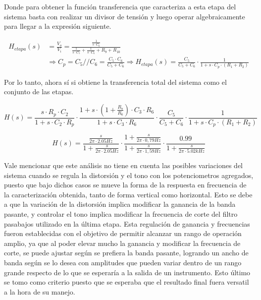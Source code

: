 Donde para obtener la funci\'on transferencia que caracteriza a esta etapa del sistema basta con realizar un divisor de tensi\'on y luego operar algebraicamente
para llegar a la expresi\'on siguiente.

\begin{align*}
    H_{etapa}(s) &= \frac{V_o}{V_i} = \frac{\frac{1}{s \cdot C_6}}{\frac{1}{s \cdot C_5} + \frac{1}{s \cdot C_6} + R_9 + R_10} \\
    & 
    \Rightarrow C_p = C_5 // C_6 = \frac{C_5 \cdot C_6}{C_5 + C_6}
    \Rightarrow
    H_{etapa}(s) = \frac{C_5}{C_5 + C_6} \cdot \frac{1}{1 + s \cdot C_p \cdot (R_1 + R_2)}
\end{align*}

Por lo tanto, ahora s\'i si obtiene la transferencia total del sistema como el conjunto de las etapas.

\begin{equation*}
    H(s) = \frac{s \cdot R_p \cdot C_2}{1 + s \cdot C_2 \cdot R_p} \cdot \frac{1 + s \cdot (1 + \frac{R_7}{R_6}) \cdot C_3 \cdot R_6}{1 + s \cdot C_3 \cdot R_6} \cdot \frac{C_5}{C_5 + C_6} \cdot \frac{1}{1 + s \cdot C_p \cdot (R_1 + R_2)}
\end{equation*}

\begin{equation}
    H(s) = \frac{\frac{s}{2\pi \cdot 2.05Hz}}{1 + \frac{s}{2 \pi \cdot 2.05Hz}} \cdot \frac{1 + \frac{s}{2 \pi \cdot 0,79Hz}}{1 + \frac{s}{2\pi \cdot 1,59Hz}} \cdot \frac{0.99}{1 + \frac{s}{2 \pi \cdot 5.02kHz}}
\end{equation}

Vale mencionar que este an\'alisis no tiene en cuenta las posibles variaciones del sistema cuando se regula la distorsi\'on y el tono con los potenciometros agregados, puesto que bajo dichos casos se mueve
la forma de la respuesta en frecuencia de la caracterizaci\'on obtenida, tanto de forma vertical como horizontal. Esto se debe a que la variaci\'on de la distorsi\'on implica modificar la ganancia de la banda pasante,
y controlar el tono implica modificar la frecuencia de corte del filtro pasabajos utilizado en la \'ultima etapa. Esta regulaci\'on de ganancia y frecuencias fueron establecidas con el objetivo de permitir alcanzar un rango de operaci\'on
amplio, ya que al poder elevar mucho la ganancia y modificar la frecuencia de corte, se puede ajustar seg\'un se prefiera la banda pasante, logrando un ancho de banda seg\'un se lo desea con amplitudes que pueden variar dentro de un rango
grande respecto de lo que se esperar\'ia a la salida de un instrumento. Esto \'ultimo se tomo como criterio puesto que se esperaba que el resultado final fuera versatil a la hora de su manejo.

